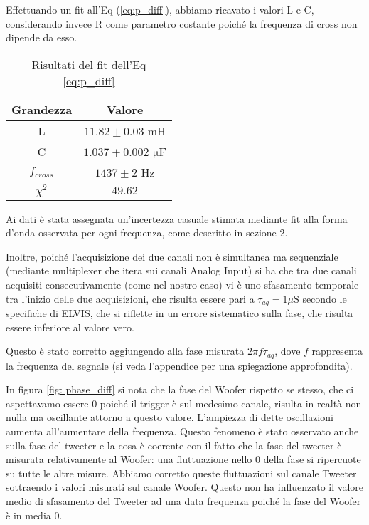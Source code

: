 \documentclass[../Relazione_circuiti]{subfiles}
\begin{document}
  
Effettuando un fit all'Eq (\ref{eq:p_diff}), abbiamo ricavato i valori L e C, considerando invece R come parametro costante poiché la frequenza di cross non dipende da esso.


\begin{table}[H]
\centering

\begin{tabular}{c | c }
Grandezza & Valore  \\
\hline
L & $ 11.82 \pm 0.03 $  mH \\
C & $ 1.037 \pm 0.002 $  $\mathrm{\mu}$F \\
$f_{cross}$ & $ 1437 \pm 2$  Hz \\
$\chi^2$ & $49.62$ 

\end{tabular}
\caption{Risultati del fit dell'Eq \ref{eq:p_diff}}
\label{tab: fit_phase}

\end{table}
Ai dati è stata assegnata un'incertezza casuale stimata mediante fit alla forma d'onda osservata per ogni frequenza, come descritto in sezione 2. 

Inoltre, poiché l'acquisizione dei due canali non è simultanea ma sequenziale (mediante multiplexer che itera sui canali Analog Input) si ha che tra due canali acquisiti consecutivamente (come nel nostro caso) vi è uno sfasamento temporale tra l'inizio delle due acquisizioni, che risulta essere pari a $\tau_{aq}=1 \mu \mathrm{S}$ secondo le specifiche di ELVIS, che si riflette in un errore sistematico sulla fase, che risulta essere inferiore al valore vero.

Questo è stato corretto aggiungendo alla fase misurata  $ 2 \pi f \tau_{aq}$, dove $f$ rappresenta la frequenza del segnale (si veda l'appendice per una spiegazione approfondita).

In figura \ref{fig: phase_diff} si nota che la fase del Woofer rispetto se stesso, che ci aspettavamo essere 0 poiché il trigger è sul medesimo canale, risulta in realtà non nulla ma oscillante attorno a questo valore. L'ampiezza di dette oscillazioni aumenta all'aumentare della frequenza. Questo fenomeno è stato osservato anche sulla fase del tweeter e la cosa è coerente con il fatto che la fase del tweeter è misurata relativamente al Woofer: una fluttuazione nello 0 della fase si ripercuote su tutte le altre misure. Abbiamo corretto queste fluttuazioni sul canale Tweeter sottraendo i valori misurati sul canale Woofer. Questo non ha influenzato il valore medio di sfasamento del Tweeter ad una data frequenza poiché la fase del Woofer è in media 0.
\end{document}
